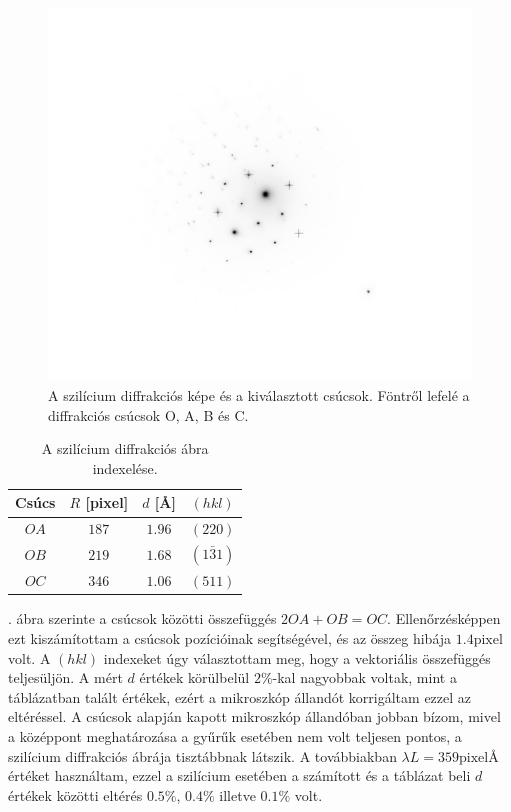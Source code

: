 \documentclass[pdftex,12pt,a4paper]{article}
\begin{document}
		\begin{figure}[H]
			\centering
			\includegraphics[scale=0.5]{si.pdf}
			\caption{A szilícium diffrakciós képe és a kiválasztott csúcsok. Föntről lefelé a diffrakciós csúcsok O, A, B és C.}
			\label{si}
		\end{figure}
		\begin{table}[H]
			\centering
			\begin{tabular}{|c|c|c|c|}
				\hline
				Csúcs & $R$ [pixel] & $d$ [\AA] & $(hkl)$\\
				\hline
				$OA$ & $187$ & $1.96$ & $(220)$\\
				$OB$ & $219$ & $1.68$ & $(1\bar{3}1)$\\
				$OC$ & $346$ & $1.06$ & $(511)$\\
				\hline
			\end{tabular}
			\caption{A szilícium diffrakciós ábra indexelése.}
		\end{table}
		. ábra szerinte a csúcsok közötti összefüggés $2OA+OB=OC$. Ellenőrzésképpen ezt kiszámítottam a csúcsok pozícióinak segítségével, és az összeg hibája $1.4\text{pixel}$ volt. A $(hkl)$ indexeket úgy választottam meg, hogy a vektoriális összefüggés teljesüljön. A mért $d$ értékek körülbelül $2\%$-kal nagyobbak voltak, mint a táblázatban talált értékek, ezért a mikroszkóp állandót korrigáltam ezzel az eltéréssel. A csúcsok alapján kapott mikroszkóp állandóban jobban bízom, mivel a középpont meghatározása a gyűrűk esetében nem volt teljesen pontos, a szilícium diffrakciós ábrája tisztábbnak látszik. A továbbiakban $\lambda L = 359\text{pixel\AA}$ értéket használtam, ezzel a szilícium esetében a számított és a táblázat beli $d$ értékek közötti eltérés $0.5\%$, $0.4\%$ illetve $0.1\%$ volt.
		
\end{document}
